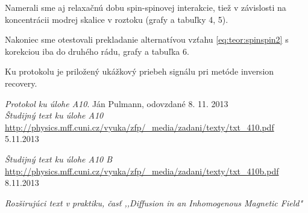 \documentclass[a4paper, 10pt]{article}
\begin{document}
Namerali sme aj relaxačnú dobu spin-spinovej interakcie, tiež v závislosti na koncentrácii modrej skalice v roztoku (grafy a tabuľky 4, 5). 

Nakoniec sme otestovali prekladanie alternatívou vzťahu \ref{eq:teor:spinspin2} s korekciou iba do druhého rádu, grafy a tabuľka 6.

Ku protokolu je priložený ukážkový priebeh signálu pri metóde inversion recovery.

\begin{thebibliography}{9}


    \emph{Protokol ku úlohe A10}. Ján Pulmann, odovzdané 8. 11. 2013\\


    \emph{Študijný text ku úlohe A10} \\
    \url{http://physics.mff.cuni.cz/vyuka/zfp/_media/zadani/texty/txt_410.pdf} 5.11.2013


    \emph{Študijný text ku úlohe A10 B} \\
    \url{http://physics.mff.cuni.cz/vyuka/zfp/_media/zadani/texty/txt_410b.pdf} 8.11.2013

    \emph{Rozširujúci text v praktiku, časť ,,Diffusion in an Inhomogenous Magnetic Field"}

\end{thebibliography}
\end{document}
